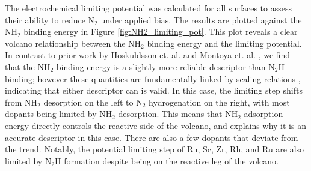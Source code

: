 The electrochemical limiting potential was calculated for all surfaces to assess their ability to reduce N$_2$ under applied bias. The results are plotted against the NH$_2$ binding energy in Figure \ref{fig:NH2_limiting_pot}. This plot reveals a clear volcano relationship between the NH$_2$ binding energy and the limiting potential. In contrast to prior work by Hoskuldsson et. al.\cite{Hoskuldsson_2017} and Montoya et. al. \cite{Montoya_2015}, we find that the NH$_2$ binding energy is a slightly more reliable descriptor than N$_2$H binding; however these quantities are fundamentally linked by scaling relations
, indicating that either descriptor can is valid. In this case, the limiting step shifts from NH$_2$ desorption on the left to N$_2$ hydrogenation on the right, with most dopants being limited by NH$_2$ desorption. This means that NH$_2$ adsorption energy directly controls the reactive side of the volcano, and explains why it is an accurate descriptor in this case. There are also a few dopants that deviate from the trend. 
Notably, the potential limiting step of  Ru, Sc, Zr, Rh, and Ru are also limited by N$_2$H formation despite being on the reactive leg of the volcano.

